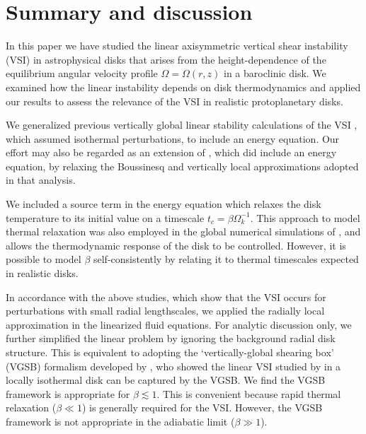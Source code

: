 \section{Summary and discussion}\label{summary}
In this paper we have studied the linear axisymmetric vertical shear
instability (VSI) in astrophysical disks that arises from the
height-dependence of the equilibrium angular velocity profile
$\Omega=\Omega(r,z)$ in a baroclinic disk. We examined how
the linear instability depends on disk thermodynamics and applied our
results to assess the relevance of the VSI in realistic protoplanetary
disks.  


We generalized previous vertically global linear stability calculations
of the VSI \citep{nelson13,mcnally14}, which assumed isothermal
perturbations, to include an energy equation. Our effort may also be
regarded as an extension of \cite{urpin03}, which did include an
energy equation, by relaxing the Boussinesq and vertically local
approximations adopted in that analysis.      

We included a source term in the energy equation which relaxes the disk
temperature to its initial value on a timescale
$t_c=\beta\Omega_k^{-1}$. This approach to model thermal relaxation was also
employed in the global numerical simulations of \cite{nelson13}, and
allows the thermodynamic response of the disk to be controlled.
However, it is possible to model $\beta$ self-consistently by
relating it to thermal timescales expected in realistic disks. 

In accordance with the above studies, which show that the VSI occurs for 
perturbations with small radial lengthscales, we applied the 
radially local approximation in the linearized fluid equations. For
analytic discussion only, we further simplified the linear problem by
ignoring the background radial disk structure. This is equivalent to adopting
the `vertically-global shearing box' (VGSB) formalism developed by
\cite{mcnally14}, who showed the linear VSI studied by
\cite{nelson13} in a locally isothermal disk can be captured by the
VGSB. We find the VGSB framework is appropriate for $\beta\lesssim1$. 
This is convenient because rapid thermal relaxation ($\beta\ll1$) is
generally required for the VSI.  However, the VGSB framework is not
appropriate in the adiabatic limit ($\beta \gg 1$). 
   
